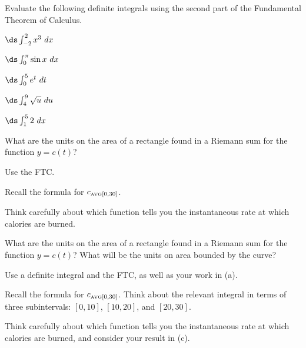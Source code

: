 \begin{activity} \label{A:4.5.1}  Evaluate the following definite integrals using the second part of the Fundamental Theorem of Calculus.
\ba
\item $\ds \int_{-2}^2 x^3\ dx$
\item $\ds \int_0^\pi \sin x\ dx$
\item $\ds \int_0^5 e^t\ dt$
\item $\ds \int_4^9 \sqrt{u}\ du$
\item $\ds \int_1^5 2\ dx$
\ea
\end{activity}
\begin{smallhint}
\ba
	\item What are the units on the area of a rectangle found in a Riemann sum for the function $y= c(t)$?
	\item Use the FTC.
	\item Recall the formula for $c_{\mbox{\tiny{AVG}}[0,30]}$.
	\item Think carefully about which function tells you the instantaneous rate at which calories are burned.
\ea
\end{smallhint}
\begin{bighint}
\ba
	\item What are the units on the area of a rectangle found in a Riemann sum for the function $y= c(t)$?  What will be the units on area bounded by the curve?
	\item Use a definite integral and the FTC, as well as your work in (a).
	\item Recall the formula for $c_{\mbox{\tiny{AVG}}[0,30]}$.  Think about the relevant integral in terms of three subintervals: $[0,10]$, $[10,20]$, and $[20,30]$.
	\item Think carefully about which function tells you the instantaneous rate at which calories are burned, and consider your result in (c).
\ea
\end{bighint}
